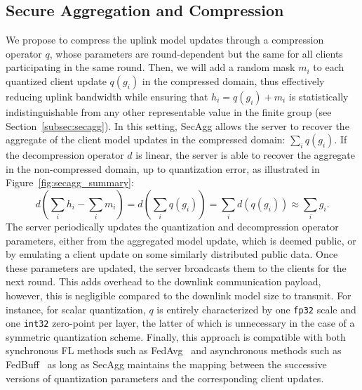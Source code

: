 \documentclass[11pt]{article}
\newcommand{\SecAgg}{{\sc SecAgg}\xspace}
\newcommand{\ashkan}[1]{{\color{blue}Ashkan: #1}}
\newcommand{\modif}[1]{{\color{black}#1}}
\begin{document}
\subsection{Secure Aggregation and Compression}
\label{subsec:secagg_comp}
We propose to compress the uplink model updates through a compression operator $q$, whose parameters are round-dependent but the same for all clients participating in the same round.
Then, we will add a random mask $m_i$ to each quantized client update $q(g_i)$ in the compressed domain, thus effectively reducing uplink bandwidth while ensuring that $h_i = q(g_i) + m_i$ is statistically indistinguishable from any other representable value in the finite group (see Section~\ref{subsec:secagg}).
In this setting, \SecAgg allows the server to recover the aggregate of the client model updates in the compressed domain: $\sum_i q(g_i)$.
If the decompression operator $d$ is linear, the server is able to recover the aggregate in the non-compressed domain, up to quantization error, as illustrated in Figure~\ref{fig:secagg_summary}:
\begin{equation*}\textstyle
    d\left(\sum_i h_i - \sum_i m_i\right) = d\left(\sum_i q(g_i)\right) =\sum_i d(q(g_i)) \approx \sum_i g_i.
\end{equation*}
The server periodically updates the quantization and decompression operator parameters, either from the aggregated model update, which is deemed public, or by emulating a client update on some similarly distributed public data. Once these parameters are updated, the server broadcasts them to the clients for the next round. \modif{This adds overhead to the downlink communication payload, however, this is negligible compared to the downlink model size to transmit}. For instance, for scalar quantization, $q$ is entirely characterized by one \texttt{fp32} scale and one \texttt{int32} zero-point per layer, the latter of which is unnecessary in the case of a symmetric quantization scheme. Finally, this approach is compatible with both synchronous FL methods such as FedAvg~\cite{Graham-mcmahan2016communicationefficient} and asynchronous methods such as FedBuff~\cite{Graham-nguyen2021federated} as long as \SecAgg maintains the mapping between the successive versions of quantization parameters and the corresponding client updates.
\end{document}
